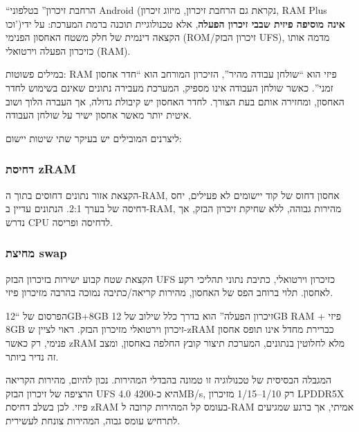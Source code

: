 


“הרחבת זיכרון” בטלפוני Android (נקראת גם הרחבת זיכרון, מיזוג זיכרון, RAM Plus וכו')\textbf{אינה מוסיפה פיזית שבבי זיכרון הפעלה}, אלא טכנולוגיית תוכנה ברמת המערכת: על ידי הקצאה דינמית של חלק משטח האחסון הפנימי (ROM/זיכרון הבזק UFS), מדמה אותו כזיכרון הפעלה וירטואלי (RAM).

במילים פשוטות: RAM פיזי הוא “שולחן עבודה מהיר”, הזיכרון המורחב הוא “חדר אחסון זמני”. כאשר שולחן העבודה אינו מספיק, המערכת מעבירה נתונים שאינם בשימוש לחדר האחסון, ומחזירה אותם בעת הצורך. לחדר האחסון יש קיבולת גדולה, אך העברה הלוך ושוב איטית יותר מאשר אחסון ישיר על שולחן העבודה.


ליצרנים המובילים יש בעיקר שתי שיטות יישום:

\subsubsection*{דחיסת zRAM}

הקצאת אזור נתונים דחוסים בתוך ה-RAM, אחסון דחוס של קוד יישומים לא פעילים, יחס דחיסה של בערך 2:1. הנתונים עדיין ב-RAM, מהירות גבוהה, ללא שחיקת זיכרון הבזק, אך נדרש CPU לדחיסה ופריסה.

\subsubsection*{מחיצת swap}

הקצאת שטח קבוע ישירות בזיכרון הבזק UFS כזיכרון וירטואלי, כתיבת נתוני תהליכי רקע לאחסון. תלוי ברוחב הפס של האחסון, מהירות קריאה/כתיבה נמוכה בהרבה מזיכרון פיזי.

הפרסום של “12GB+8GB זיכרון הפעלה” הוא בדרך כלל שילוב של 12GB RAM פיזי + 8GB זיכרון וירטואלי מזיכרון הבזק. ראוי לציין ש-zRAM כברירת מחדל אינו תופס אחסון פנימי, רק כאשר zRAM מלא לחלוטין בנתונים, המערכת תיצור קובץ החלפה באחסון, ומצב זה נדיר ביותר.


המגבלה הבסיסית של טכנולוגיה זו טמונה בהבדלי המהירות. נכון להיום, מהירות הקריאה הרציפה של זיכרון הבזק UFS 4.0 היא כ-4200MB/s, רק 1/10–1/15 מזיכרון LPDDR5X פיזי. לכן בשלב דחיסת zRAM בעומס קל המהירות קרובה ל-RAM אמיתי, אך ברגע שמגיעים לתרחיש עומס גבוה, המהירות צונחת לעשירית.

